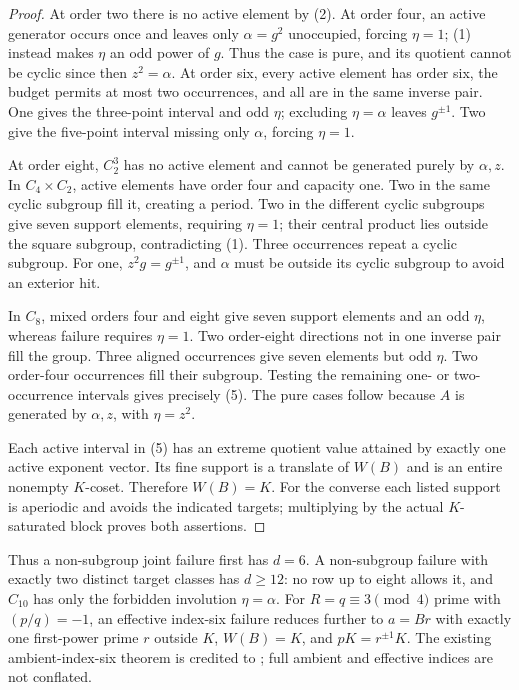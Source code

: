 \documentclass[10pt,a4paper]{article}
\begin{document}
\begin{proof}
At order two there is no active element by (2). At order four, an active
generator occurs once and leaves only $\alpha=g^2$ unoccupied, forcing
$\eta=1$; (1) instead makes $\eta$ an odd power of $g$. Thus the case is pure,
and its quotient cannot be cyclic since then $z^2=\alpha$.
At order six, every active element has order six, the budget permits at most
two occurrences, and all are in the same inverse pair. One gives the three-point
interval and odd $\eta$; excluding $\eta=\alpha$ leaves $g^{\pm1}$. Two give
the five-point interval missing only $\alpha$, forcing $\eta=1$.

At order eight, $C_2^3$ has no active element and cannot be generated purely
by $\alpha,z$. In $C_4\times C_2$, active elements have order four and capacity
one. Two in the same cyclic subgroup fill it, creating a period. Two in the
different cyclic subgroups give seven support elements, requiring $\eta=1$;
their central product lies outside the square subgroup, contradicting (1).
Three occurrences repeat a cyclic subgroup. For one, $z^2g=g^{\pm1}$, and
$\alpha$ must be outside its cyclic subgroup to avoid an exterior hit.

In $C_8$, mixed orders four and eight give seven support elements and an odd
$\eta$, whereas failure requires $\eta=1$. Two order-eight directions not in
one inverse pair fill the group. Three aligned occurrences give seven elements
but odd $\eta$. Two order-four occurrences fill their subgroup. Testing the
remaining one- or two-occurrence intervals gives precisely (5). The pure cases
follow because $A$ is generated by $\alpha,z$, with $\eta=z^2$.

Each active interval in (5) has an extreme quotient value attained by exactly
one active exponent vector. Its fine support is a translate of $W(B)$ and is
an entire nonempty $K$-coset. Therefore $W(B)=K$. For the converse each listed
support is aperiodic and avoids the indicated targets; multiplying by the
actual $K$-saturated block proves both assertions.
\end{proof}

Thus a non-subgroup joint failure first has $d=6$. A non-subgroup failure with
exactly two distinct target classes has $d\ge12$: no row up to eight allows
it, and $C_{10}$ has only the forbidden involution $\eta=\alpha$.
For $R=q\equiv3\pmod4$ prime with $(p/q)=-1$, an effective index-six failure
reduces further to $a=Br$ with exactly one first-power prime $r$ outside $K$,
$W(B)=K$, and $pK=r^{\pm1}K$. The existing ambient-index-six theorem is
credited to \cite{Bryan}; full ambient and effective indices are not conflated.
\end{document}
